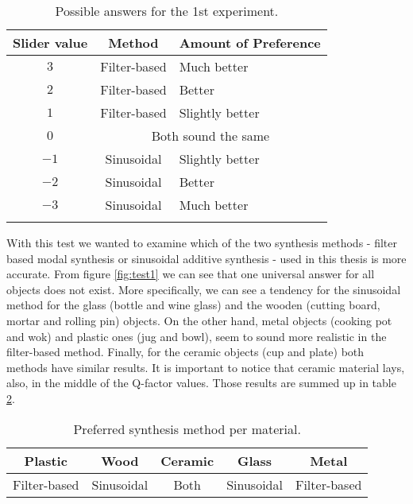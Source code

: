 \begin{table}[H]
	\centering
    \begin{tabular}{ c  c  l  }
    \toprule
    \textbf{Slider value} & \textbf{Method} & \textbf{Amount of Preference} \\ \toprule
    \addlinespace
    $3$ & Filter-based & Much better  \\
    $2$ & Filter-based & Better \\
    $1$ & Filter-based & Slightly better \\ 
    \addlinespace
    $0$ & \multicolumn{2}{c}{Both sound the same} \\
    \addlinespace
    $-1$ & Sinusoidal & Slightly better \\ 
    $-2$ & Sinusoidal & Better \\ 
    $-3$ & Sinusoidal & Much better \\
    \addlinespace
    \bottomrule
    \end{tabular}
    \caption{Possible answers for the 1st experiment.}
    \label{tab:test1_ans}
\end{table}  

With this test we wanted to examine which of the two synthesis methods - filter based modal synthesis or sinusoidal additive synthesis - used in this thesis is more accurate. From figure \ref{fig:test1} we can see that one universal answer for all objects does not exist. More specifically, we can see a tendency for the sinusoidal method for the glass (bottle and wine glass) and the wooden (cutting board, mortar and rolling pin) objects. On the other hand, metal objects (cooking pot and wok) and plastic ones (jug and bowl), seem to sound more realistic in the filter-based method. Finally, for the ceramic objects (cup and plate) both methods have similar results. It is important to notice that ceramic material lays, also, in the middle of the Q-factor values. Those results are summed up in table \ref{tab:method_mat}.

\begin{table}[H]
	\centering
    \begin{tabular}{ c  c  c c c }
    \toprule
    \textbf{Plastic} & \textbf{Wood} & \textbf{Ceramic} & \textbf{Glass} & \textbf{Metal} \\ \toprule
    Filter-based & Sinusoidal & Both & Sinusoidal & Filter-based  \\
    \bottomrule
    \end{tabular}
    \caption{Preferred synthesis method per material.}
    \label{tab:method_mat}
\end{table} 

